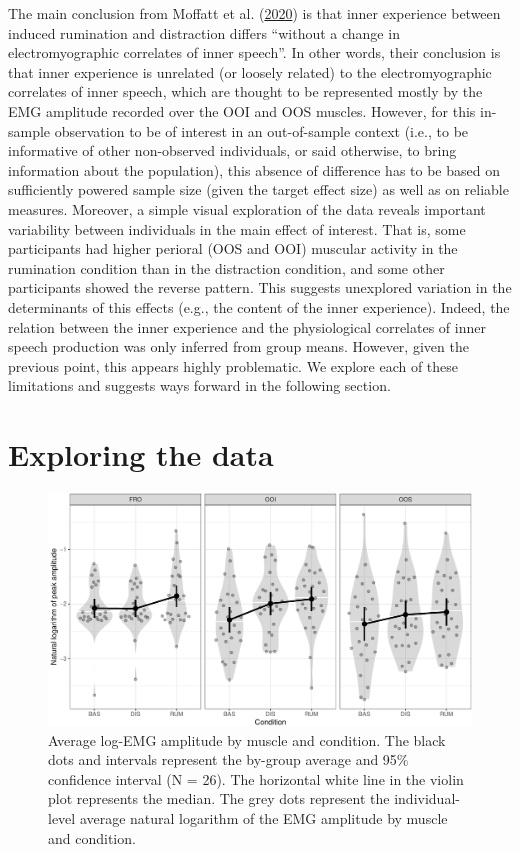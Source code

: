 \documentclass[
  english,
  man,floatsintext]{apa6}
\begin{document}
The main conclusion from Moffatt et al. (\protect\hyperlink{ref-moffatt_inner_2020}{2020}) is that inner experience between induced rumination and distraction differs ``without a change in electromyographic correlates of inner speech''. In other words, their conclusion is that inner experience is unrelated (or loosely related) to the electromyographic correlates of inner speech, which are thought to be represented mostly by the EMG amplitude recorded over the OOI and OOS muscles. However, for this in-sample observation to be of interest in an out-of-sample context (i.e., to be informative of other non-observed individuals, or said otherwise, to bring information about the population), this absence of difference has to be based on sufficiently powered sample size (given the target effect size) as well as on reliable measures. Moreover, a simple visual exploration of the data reveals important variability between individuals in the main effect of interest. That is, some participants had higher perioral (OOS and OOI) muscular activity in the rumination condition than in the distraction condition, and some other participants showed the reverse pattern. This suggests unexplored variation in the determinants of this effects (e.g., the content of the inner experience). Indeed, the relation between the inner experience and the physiological correlates of inner speech production was only inferred from group means. However, given the previous point, this appears highly problematic. We explore each of these limitations and suggests ways forward in the following section.

\hypertarget{exploring-the-data}{%
\section{Exploring the data}\label{exploring-the-data}}

\begin{figure}[!htb]

{\centering \includegraphics[width=1\linewidth]{reanalysis_files/figure-latex/general-1} 

}

\caption{Average log-EMG amplitude by muscle and condition. The black dots and intervals represent the by-group average and 95\% confidence interval (N = 26). The horizontal white line in the violin plot represents the median. The grey dots represent the individual-level average natural logarithm of the EMG amplitude by muscle and condition.}\label{fig:general}
\end{figure}
\end{document}
